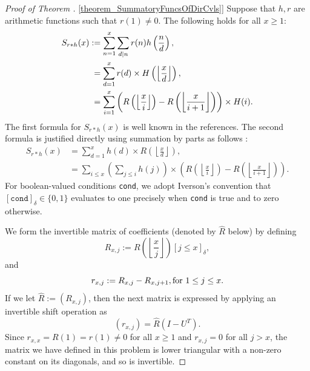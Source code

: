 \documentclass[11pt,reqno,a4letter]{article}
\newcommand{\hlocalref}[1]{\hyperref[#1]{\ref{#1}}}
\numberwithin{equation}{section}
\numberwithin{figure}{section}
\numberwithin{table}{section}
\newcommand{\Iverson}[1]{\ensuremath{\left[#1\right]_{\delta}}}
\newcommand{\floor}[1]{\left\lfloor #1 \right\rfloor}
\newcommand{\Floor}[2]{\ensuremath{\left\lfloor \frac{#1}{#2} \right\rfloor}}
\theoremstyle{plain}
\numberwithin{theorem}{section}
\theoremstyle{definition}
\theoremstyle{remark}
\newcommand{\mathtext}[1]{\text{\rm #1}}
\begin{document}
\begin{proof}[Proof of Theorem \hlocalref{theorem_SummatoryFuncsOfDirCvls}] 
\label{proofOf_theorem_SummatoryFuncsOfDirCvls} 
Suppose that $h,r$ are arithmetic functions such that $r(1) \neq 0$. 
The following holds for all $x \geq 1$: 
\begin{align} 
\notag 
S_{r \ast h}(x) & := \sum_{n=1}^{x} \sum_{d|n} r(n) h\left(\frac{n}{d}\right), \\ 
\notag
     & \phantom{:} = 
     \sum_{d=1}^x r(d) \times H\left(\floor{\frac{x}{d}}\right), \\ 
\label{eqn_proof_tag_PigAsthx_ExactSummationFormula_exp_v2} 
     & \phantom{:} = 
     \sum_{i=1}^x \left(R\left(\floor{\frac{x}{i}}\right) - R\left(\floor{\frac{x}{i+1}}\right)\right) \times H(i). 
\end{align} 
The first formula for $S_{r \ast h}(x)$ is well known in the references. 
The second formula is justified directly using 
summation by parts as follows \cite[\S 2.10(ii)]{NISTHB}: 
\begin{align*} 
S_{r \ast h}(x) & = \sum_{d=1}^x h(d) \times R\left(\floor{\frac{x}{d}}\right), \\ 
     & = \sum_{i \leq x} \left(\sum_{j \leq i} h(j)\right) \times 
     \left(R\left(\floor{\frac{x}{i}}\right) - 
     R\left(\floor{\frac{x}{i+1}}\right)\right). 
\end{align*} 
For boolean-valued conditions \texttt{cond}, we adopt Iverson's convention that 
$\Iverson{\mathtt{cond}} \in \{0, 1\}$ evaluates to one precisely when 
\texttt{cond} is true and to zero otherwise.

We form the invertible matrix of coefficients (denoted by $\hat{R}$ below) 
by defining
\[
R_{x,j} := R\left(\Floor{x}{j}\right) \Iverson{j \leq x}, 
\]
and 
\[
r_{x,j} := R_{x,j} - R_{x,j+1}, \mathtext{ for } 1 \leq j \leq x. 
\] 
If we let $\hat{R} := (R_{x,j})$, then the next matrix is 
expressed by applying an invertible shift operation as 
\[
(r_{x,j}) = \hat{R} \left(I - U^{T}\right). 
\]
Since $r_{x,x} = R(1) = r(1) \neq 0$ for all $x \geq 1$ and $r_{x,j} = 0$ for all $j > x$, 
the matrix we have defined in this problem is lower triangular with a non-zero 
constant on its diagonals, and so is invertible. 


\end{proof}
\end{document}
